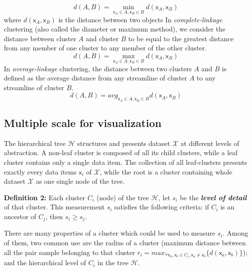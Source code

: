 \begin{equation}
\label{eq:distance_single_linkage}
d(A, B) = \min_{\mathsf{x}_A \in {A},\mathsf{x}_B \in {B}} d(\mathsf{x}_A,\mathsf{x}_B)
\end{equation}
where $d(\mathsf{x}_A,\mathsf{x}_B)$ is the distance between two objects
In \emph{complete-linkage} clustering (also called the diameter or maximum method), we consider the distance between cluster $A$ and cluster $B$ to be equal to the greatest distance from any member of one cluster to any member of the other cluster.
\begin{equation}
\label{eq:distance_complete_linkage}
d(A, B) = \max_{\mathsf{x}_A \in {A},\mathsf{x}_B \in {B}} d(\mathsf{x}_A,\mathsf{x}_B)
\end{equation}
In \emph{average-linkage} clustering, the distance between two clusters $A$ and $B$ is defined as the average distance from any streamline of cluster $A$ to any streamline of cluster $B$.
\begin{equation}
\label{eq:distance_average_linkage}
d(A, B) = avg_{\mathsf{x}_A \in {A},\mathsf{x}_B \in {B}} d(\mathsf{x}_A,\mathsf{x}_B)
\end{equation}

\subsection{Multiple scale for visualization}
\label{sec:multiscale}
The hierarchical tree $\mathcal{H}$ structures and presents dataset $\mathcal{X}$ at different levels of abstraction. A non-leaf cluster is composed of all its child clusters, while a leaf cluster contains only a single data item. The collection of all leaf-clusters presents exactly every data items $\mathsf{x}_i$ of $\mathcal{X}$, while the root is a cluster containing whole dataset $\mathcal{X}$ as one single node of the tree.

\textbf{Definition 2:} Each cluster $C_i$ (node) of the tree $\mathcal{H}$, let $s_i$ be the \textbf{\textit{level of detail}} of that cluster. This measurement $s_i$ satisfies the following criteria: if $C_i$ is an ancestor of $C_j$, then $s_i \geq s_j$. 

There are many properties of a cluster which could be used to measure $s_i$. Among of them, two common use are the radius of a cluster (maximum distance between all the pair sample belonging to that cluster $r_i = max_{\forall \mathsf{x}_a, \mathsf{x}_b
 \in C_i, \mathsf{x}_a \neq \mathsf{x}_b} \{d(\mathsf{x}_a,\mathsf{x}_b)\}$); and the hierarchical level of $C_i$ in the tree $\mathcal{H}$.

